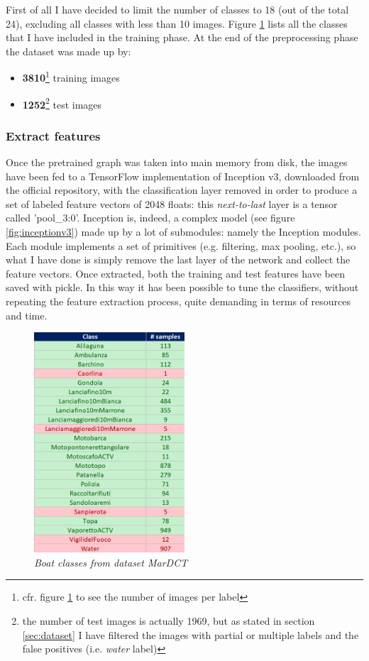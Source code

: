 \documentclass[12pt]{article}
\begin{document}
First of all I have decided to limit the number of classes to 18 (out of the total 24), excluding all classes with less than 10 images. Figure \ref{fig:labels} lists all the classes that I have included in the training phase. At the end of the preprocessing phase the dataset was made up by:
\begin{itemize}
	\item \textbf{3810}\footnote{cfr. figure \ref{fig:labels} to see the number of images per label} training images
	\item \textbf{1252}\footnote{the number of test images is actually 1969, but as stated in section \ref{sec:dataset} I have filtered the images with partial or multiple labels and the false positives (i.e. \textit{water} label)} test images
\end{itemize}

\subsubsection{Extract features}
Once the pretrained graph was taken into main memory from disk, the images have been fed to a TensorFlow implementation of Inception v3, downloaded from the official repository, with the classification layer removed in order to produce a set of labeled feature vectors of 2048 floats: this \textit{next-to-last} layer is a tensor called 'pool\_3:0'. Inception is, indeed, a complex model (see figure \ref{fig:inceptionv3}) made up by a lot of submodules: namely the Inception modules. Each module implements a set of primitives (e.g. filtering, max pooling, etc.), so what I have done is simply remove the last layer of the network and collect the feature vectors. Once extracted, both the training and test features have been saved with pickle. In this way it has been possible to tune the classifiers, without repeating the feature extraction process, quite demanding in terms of resources and time.
\begin{figure}[!hb]
	\centering 
	\includegraphics[width=0.5\textwidth]{labels.png} 
	\caption{\textit{Boat classes from dataset MarDCT}} 
	\label{fig:labels}
\end{figure}
\end{document}
